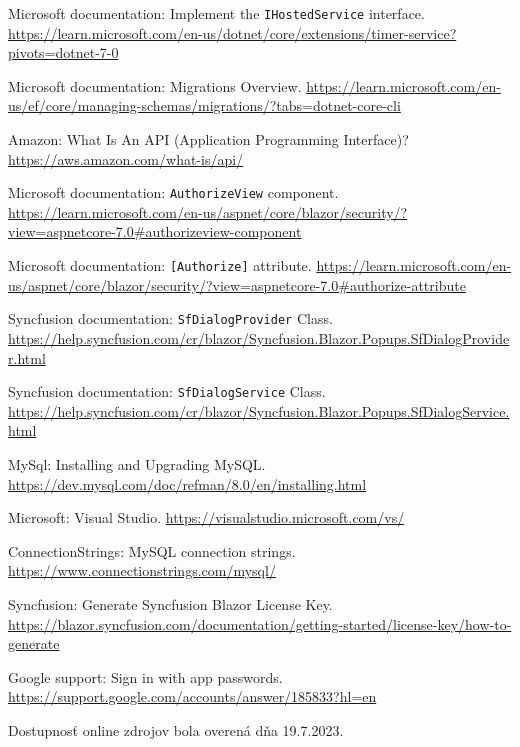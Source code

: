 \begin{thebibliography}{99}
Microsoft documentation: Implement the \verb|IHostedService| interface.
\url{https://learn.microsoft.com/en-us/dotnet/core/extensions/timer-service?pivots=dotnet-7-0}

Microsoft documentation: Migrations Overview.
\url{https://learn.microsoft.com/en-us/ef/core/managing-schemas/migrations/?tabs=dotnet-core-cli}

Amazon: What Is An API (Application Programming Interface)?
\url{https://aws.amazon.com/what-is/api/}

Microsoft documentation: \verb|AuthorizeView| component.
\url{https://learn.microsoft.com/en-us/aspnet/core/blazor/security/?view=aspnetcore-7.0\#authorizeview-component}

Microsoft documentation: \verb|[Authorize]| attribute.
\url{https://learn.microsoft.com/en-us/aspnet/core/blazor/security/?view=aspnetcore-7.0\#authorize-attribute}

Syncfusion documentation: \verb|SfDialogProvider| Class.
\url{https://help.syncfusion.com/cr/blazor/Syncfusion.Blazor.Popups.SfDialogProvider.html}

Syncfusion documentation: \verb|SfDialogService| Class.
\url{https://help.syncfusion.com/cr/blazor/Syncfusion.Blazor.Popups.SfDialogService.html}

MySql: Installing and Upgrading MySQL.
\url{https://dev.mysql.com/doc/refman/8.0/en/installing.html}

Microsoft: Visual Studio.
\url{https://visualstudio.microsoft.com/vs/}

ConnectionStrings: MySQL connection strings.
\url{https://www.connectionstrings.com/mysql/}

Syncfusion: Generate Syncfusion Blazor License Key.
\url{https://blazor.syncfusion.com/documentation/getting-started/license-key/how-to-generate}

Google support: Sign in with app passwords.
\url{https://support.google.com/accounts/answer/185833?hl=en}
\end{thebibliography}

\hspace{1cm}

Dostupnosť online zdrojov bola overená dňa 19.7.2023.
